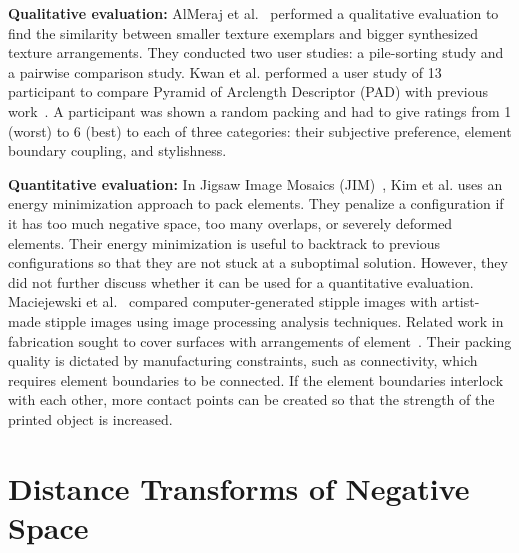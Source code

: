 \newtext
{
\textbf{Qualitative evaluation:}
AlMeraj et al.~\cite{AlMerajEval2003} performed a qualitative evaluation to find
the similarity between smaller texture exemplars and bigger synthesized texture arrangements.
They conducted two user studies: a pile-sorting study and a pairwise comparison study.
Kwan et al. performed a user study of 13 participant to compare Pyramid of Arclength Descriptor (PAD) with previous work~\cite{Kwan2016}.
A participant was shown a random packing and had to give ratings from 1 (worst) to 6 (best)
to each of three categories: their subjective preference, element boundary coupling, and stylishness.
}

\newtext
{
\textbf{Quantitative evaluation:}
In Jigsaw Image Mosaics (JIM)~\cite{Kim2002}, Kim et al. uses an energy minimization approach
to pack elements. They penalize a configuration if it has too much negative space,
too many overlaps, or severely deformed elements. 
Their energy minimization is useful to backtrack to previous configurations 
so that they are not stuck at a suboptimal solution.
However, they did not further discuss whether it can be used for a quantitative evaluation.
Maciejewski et al.~\cite{Maciejewski2008} compared computer-generated stipple images
with artist-made stipple images using image processing analysis techniques. %
Related work in fabrication sought to cover surfaces with arrangements of element~\cite{Zehnder2016, Chen2017}.
Their packing quality is dictated by manufacturing constraints, such as connectivity, %
which requires element boundaries to be connected.
If the element boundaries interlock with each other, 
more contact points can be created so that the strength of the printed object is increased.}

\section{Distance Transforms of Negative Space}

